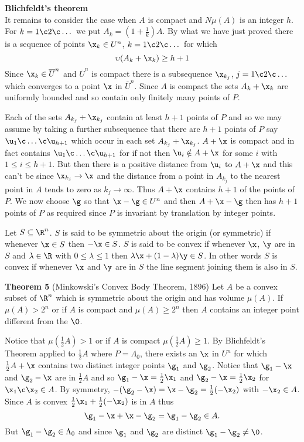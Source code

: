 \textbf{Blichfeldt's theorem} \\
It remains to consider the case when $A$ is compact and $N\mu(A)$ is an integer $h$.  For $k=1\c 2\c \dotsc$ we put $A_k=(1+\frac1k)A$.  By what we have just proved there is a sequence of points $\x_k\in U^n$, $k=1\c 2\c \dotsc$ for which
\[ \upsilon(A_k+\x_k)\geq h+1 \]
Since $\x_k\in\overline U^n$ and $\overline U^n$ is compact there is a subsequence $\x_{k_j}$, $j=1\c 2\c \dotsc$ which converges to a point $\x$ in $\overline U^n$.  Since $A$ is compact the sets $A_k+\x_k$ are uniformly bounded and so contain only finitely many points of $P$.

Each of the sets $A_{k_j}+\x_{k_j}$ contain at least $h+1$ points of $P$ and so we may assume by taking a further subsequence that there are $h+1$ points of $P$ say $\u_1\c \dotsc\c \u_{h+1}$ which occur in each set $A_{k_j}+\x_{k_j}$.  $A+\x$ is compact and in fact contains $\u_1\c \dotsc\c \u_{h+1}$ for if not then $\u_i\notin A+\x$ for some $i$ with $1\leq i\leq h+1$.  But then there is a positive distance from $\u_i$ to $A+\x$ and this can't be since $\x_{k_j}\to\x$ and the distance from a point in $A_{k_j}$ to the nearest point in $A$ tends to zero as $k_j\to\infty$.  Thus $A+\x$ contains $h+1$ of the points of $P$.  We now choose $\g$ so that $\x-\g\in U^n$ and then $A+\x-\g$ then has $h+1$ points of $P$ as required since $P$ is invariant by translation by integer points.

Let $S\subseteq\R^n$.  $S$ is said to be symmetric about the origin (or symmetric) if whenever $\x\in S$ then $-\x\in S$.  $S$ is said to be convex if whenever $\x$, $\y$ are in $S$ and $\lambda\in\R$ with $0\leq\lambda\leq1$ then $\lambda\x+(1-\lambda)\y\in S$.  In other words $S$ is convex if whenever $\x$ and $\y$ are in $S$ the line segment joining them is also in $S$.

\textbf{Theorem 5} (Minkowski's Convex Body Theorem, 1896) Let $A$ be a convex subset of $\R^n$ which is symmetric about the origin and has volume $\mu(A)$.  If $\mu(A)>2^n$ or if $A$ is compact and $\mu(A)\geq2^n$ then $A$ contains an integer point different from the $\0$.

\pf Notice that $\mu(\frac12 A)>1$ or if $A$ is compact $\mu(\frac12 A)\geq1$.  By Blichfeldt's Theorem applied to $\frac12 A$ where $P=\Lambda_0$, there exists an $\x$ in $U^n$ for which $\frac12 A+\x$ contains two distinct integer points $\g_1$ and $\g_2$.  Notice that $\g_1-\x$ and $\g_2-\x$ are in $\frac12 A$ and so $\g_1-\x=\frac12\x_1$ and $\g_2-\x=\frac12\x_2$ for $\x_1\c \x_2\in A$.  By symmetry, $-(\g_2-\x)=\x-\g_2=\frac12(-\x_2)$ with $-\x_2\in A$.  Since $A$ is convex $\frac12\x_1+\frac12(-\x_2)$ is in $A$ thus
\[ \g_1-\x + \x - \g_2 = \g_1 - \g_2 \in A . \]
But $\g_1-\g_2\in\Lambda_0$ and since $\g_1$ and $\g_2$ are distinct $\g_1-\g_2\neq\0$.

